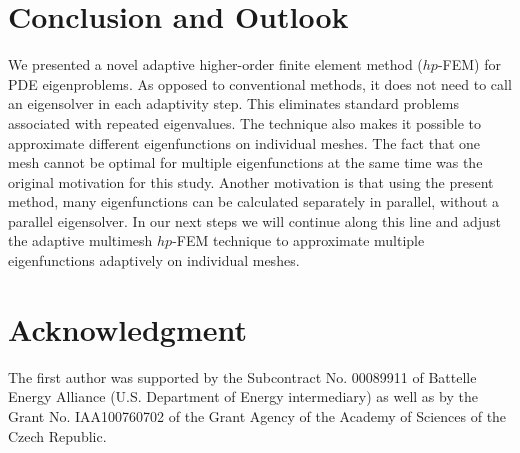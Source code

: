 \documentclass[preprint,12pt]{elsarticle}
\begin{document}
\section{Conclusion and Outlook}\label{sec:conclusion}

We presented a novel adaptive higher-order finite element method ($hp$-FEM) 
for PDE eigenproblems. As opposed to conventional methods, it does not need
to call an eigensolver in each adaptivity step. This eliminates standard 
problems associated with repeated eigenvalues. The technique also makes it 
possible to approximate different eigenfunctions on individual meshes. 
The fact that one mesh cannot be optimal for multiple eigenfunctions at the
same time was the original motivation for this study. Another motivation is 
that using the present method, many eigenfunctions can be calculated separately 
in parallel, without a parallel eigensolver. In our next steps we will continue 
along this line and adjust the adaptive multimesh $hp$-FEM technique \cite{solin2} 
to approximate multiple eigenfunctions adaptively on individual meshes.

\section*{Acknowledgment}

The first author was supported by the Subcontract No. 00089911 of Battelle Energy
Alliance (U.S. Department of Energy intermediary) as well as by the Grant No. 
IAA100760702 of the Grant Agency of the Academy of Sciences of the Czech Republic.


\clearpage
\end{document}
